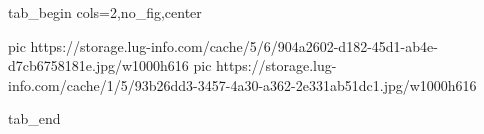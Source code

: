  
 
 
 
 


\ifcmt
  tab_begin cols=2,no_fig,center

     pic https://storage.lug-info.com/cache/5/6/904a2602-d182-45d1-ab4e-d7cb6758181e.jpg/w1000h616
     pic https://storage.lug-info.com/cache/1/5/93b26dd3-3457-4a30-a362-2e331ab51dc1.jpg/w1000h616

  tab_end
\fi
